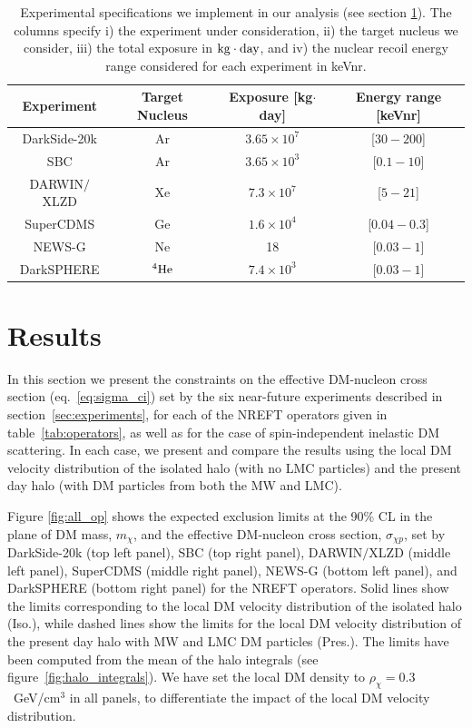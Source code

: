 \documentclass[a4paper,11pt]{article}
\begin{document}
\begin{table}[t]
\centering
\begin{tabular}{|c c c c |}
 \hline
 Experiment & Target Nucleus & Exposure [kg$\cdot$ day] & Energy range [keVnr] \\ [0.5ex] 
 \hline%
 DarkSide-20k \cite{DarkSide-20k:2017zyg} & Ar & $3.65\times 10^{7}$ & [$30 - 200$] \\
  \hline
 SBC \cite{Alfonso-Pita:2023frp} & Ar & $3.65\times 10^{3}$ & [$0.1 - 10$] \\
 \hline
 DARWIN$\slash$XLZD \cite{Schumann:2015cpa} & Xe & $7.3\times 10^{7}$ & [$5 - 21$] \\
 \hline
  SuperCDMS \cite{SuperCDMS:2016wui} & Ge & $1.6 \times 10^{4}$ & [$0.04 - 0.3$]  \\ 
 \hline
 NEWS-G \cite{Durnford:2021mzg} & Ne & 18 & [$0.03 - 1$]  \\
 \hline
 DarkSPHERE \cite{NEWS-G:2023qwh} & $^4{\rm He}$ & $7.4\times 10^{3}$ & [$0.03 - 1$]  \\ 
 \hline
\end{tabular}
\caption{\label{table:experiments}Experimental specifications we  implement in our analysis (see section \ref{sec:results}). The columns specify i) the experiment under consideration, ii) the target nucleus we consider, iii) the total exposure in $\rm{kg}\cdot\rm{day}$, and iv) the nuclear recoil energy range considered for each experiment in keVnr.}
\end{table}

\section{Results}
\label{sec:results}

In this section we present the constraints on the effective DM-nucleon cross section (eq.~\eqref{eq:sigma_ci}) set by the six near-future experiments described in section~\ref{sec:experiments}, for each of the NREFT operators given in table~\ref{tab:operators}, as well as for the case of spin-independent inelastic DM scattering. In each case, we present and compare the results using the local DM velocity distribution of the isolated halo (with no LMC particles) and the present day halo (with DM particles from both the MW and LMC). 



Figure \ref{fig:all_op} shows the expected exclusion limits at the 90\% CL in the plane of DM mass, $m_\chi$, and the effective DM-nucleon cross section, $\sigma_{\chi p}$, set by DarkSide-20k (top left panel), SBC (top right panel), DARWIN$\slash$XLZD (middle left panel), SuperCDMS (middle right panel), NEWS-G (bottom left panel), and DarkSPHERE (bottom right panel) for the NREFT operators. Solid lines show the limits corresponding to the local DM velocity distribution of the isolated halo (Iso.), while dashed lines show the limits for the local DM velocity distribution of the present day halo with MW and LMC DM particles (Pres.). The limits have been computed from the mean of the halo integrals (see figure~\ref{fig:halo_integrals}). We have set the local DM density to $\rho_\chi = 0.3$~GeV/cm$^3$ in all panels, to differentiate the impact of the local DM velocity distribution.
\end{document}
